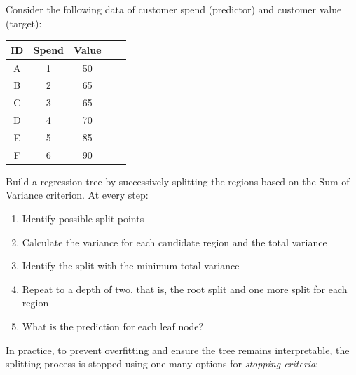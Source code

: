 \begin{exerciseboxpaper}
Consider the following data of customer spend (predictor) and customer value (target): \\

\renewcommand{\arraystretch}{1.25}
\begin{tabular}{c | c | c | c | c}
\textbf{ID} & \textbf{Spend} & \textbf{Value} \\
\hline
A & 1 & 50 \\
B & 2 & 65 \\
C & 3 & 65 \\
D & 4 & 70 \\
E & 5 & 85 \\
F & 6 & 90 \\
\end{tabular}

\bigskip
Build a regression tree by successively splitting the regions based on the Sum of Variance criterion. At every step:
\begin{enumerate}
   \item Identify possible split points
   \item Calculate the variance for each candidate region and the total variance
   \item Identify the split with the minimum total variance
   \item Repeat to a depth of two, that is, the root split and one more split for each region
   \item What is the prediction for each leaf node?
\end{enumerate}
\end{exerciseboxpaper}

In practice, to prevent overfitting and ensure the tree remains interpretable, the splitting process is stopped using one many options for \emph{stopping criteria}:

